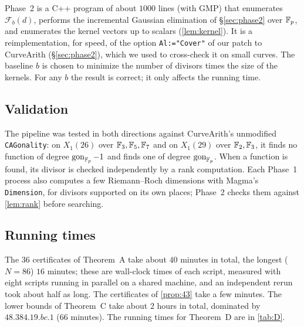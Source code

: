 Phase~2 is a C++ program of about $1000$ lines (with GMP) that enumerates $\mathcal F_b(d)$, performs the
incremental Gaussian elimination of \S\ref{sec:phase2} over $\mathbb{F}_p$, and enumerates the kernel vectors up to scalars
(\cref{lem:kernel}). It is a reimplementation, for speed, of the option \texttt{Al:="Cover"} of our patch to CurveArith (\S\ref{sec:phase2}), which we used to
cross-check it on small curves. The baseline $b$ is chosen to minimize the number of
divisors times the size of the kernels. For any $b$ the result is correct; it only affects the running time.

\subsection*{Validation}
The pipeline was tested in both directions against CurveArith's unmodified \texttt{CAGonality}: on
$X_1(26)$ over $\mathbb{F}_3,\mathbb{F}_5,\mathbb{F}_7$ and on $X_1(29)$ over $\mathbb{F}_2,\mathbb{F}_3$, it finds no function of degree
$\operatorname{gon}_{\mathbb{F}_p}-1$ and finds one of degree $\operatorname{gon}_{\mathbb{F}_p}$. When a function is found, its divisor is checked independently by a rank computation.
Each Phase~1 process also computes a few Riemann--Roch dimensions with Magma's \texttt{Dimension}, for
divisors supported on its own places; Phase~2 checks them against \cref{lem:rank} before searching.

\subsection*{Running times}
The $36$ certificates of Theorem~A take about $40$ minutes in total, the longest ($N=86$) $16$ minutes; these are
wall-clock times of each script, measured with eight scripts running in parallel on a shared machine, and an
independent rerun took about half as long.
The certificates of \cref{prop:43} take a few minutes. The lower bounds of Theorem~C take about $2$ hours in
total, dominated by $48.384.19.bc.1$ ($66$ minutes). The running times for Theorem~D are in \cref{tab:D}.
